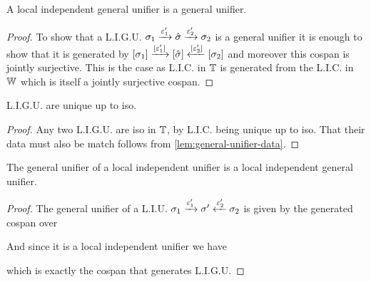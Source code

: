\begin{lemma}
    A local independent general unifier is a general unifier.
\end{lemma}
\begin{proof}
    To show that a L.I.G.U. $\sigma_1 \xrightarrow{\varepsilon_1'} \hat\sigma \xrightarrow{\varepsilon_2'} \sigma_2$ 
    is a general unifier it is enough to show that it is generated by
    $[\sigma_1] \xrightarrow{[\varepsilon_1']} [\hat\sigma] \xleftarrow{[\varepsilon_2']} [\sigma_2]$ 
    and moreover this cospan is jointly surjective.
    This is the case as L.I.C. in $\mathbb{T}$ is generated from the L.I.C. in $\mathbb{W}$ which is itself a jointly surjective cospan. 
\end{proof}

\begin{lemma}\label{lem:ligu-uniq}
    L.I.G.U. are unique up to iso.
\end{lemma}
\begin{proof}
    Any two L.I.G.U. are iso in $\mathbb{T}$, by L.I.C. being unique up to iso.
    That their data must also be match follows from \cref{lem:general-unifier-data}.
\end{proof}

\begin{lemma}\label{lem:ligu-prop}
    The general unifier of a local independent unifier is a local independent general unifier.
\end{lemma}
\begin{proof}
    The general unifier of a L.I.U. $\sigma_1 \xrightarrow{\varepsilon_1'} {\sigma'} \xleftarrow{\varepsilon_2'} \sigma_2$ is given by
    the generated cospan over
    \begin{center}
    \end{center}
    And since it is a local independent unifier we have
    \begin{center}
    \end{center}
    which is exactly the cospan that generates L.I.G.U.
\end{proof}

